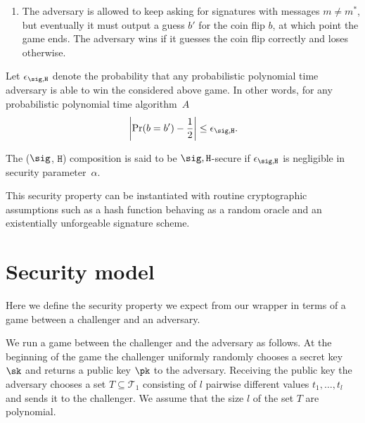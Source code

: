 \documentclass{article}
\begin{document}
{\begin{enumerate}
\item The adversary is allowed to keep asking for signatures with messages $m \neq m^*$, but eventually it must output a guess $b'$ for the coin flip $b$, at which point the game ends. The adversary wins if it guesses the coin flip correctly and loses otherwise.
\end{enumerate}

Let $\epsilon_{\sig, \texttt{H}}$ denote the probability that any probabilistic polynomial time adversary is able to win the considered above game. In other words, for any probabilistic polynomial time algorithm~$A$		
$$\left \vert \Pr(b = b') -\frac{1}{2} \right \vert \le \epsilon_{\sig, \texttt{H}}.$$

The  ($\sig$, $\texttt{H}$) composition is said to be $\sig, \texttt{H}$-secure if $\epsilon_{\sig, \texttt{H}}$ is negligible in security parameter~$\alpha$.

This security property can be instantiated with routine cryptographic assumptions such as a hash function behaving as a random oracle and an existentially unforgeable signature scheme.

\section{Security model} \label{sec:model}
Here we define the security property we expect from our wrapper in terms of a game between a challenger and an adversary.

We run a game between the challenger and the adversary as follows. At the beginning of the game the challenger uniformly randomly chooses a secret key $\sk$ and returns a public key $\pk$ to the adversary. Receiving the public key the adversary chooses a set $T \subseteq \mathcal{T}_1$ consisting of $l$ pairwise different values $t_1,\ldots,t_l$ and sends it to the challenger.  We assume that the size $l$ of the set $T$ are polynomial. 

% 

}
\end{document}
